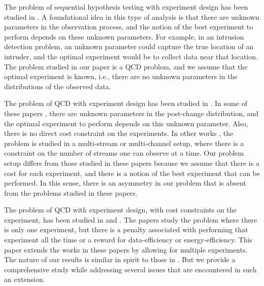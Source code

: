 \documentclass[journal, onecolumn]{IEEEtran}
\begin{document}
The problem of sequential hypothesis testing with experiment design has been studied in \cite{krishnamurthy2016, chernoff1959, bessler1960-2, albert1961, kiefer1963, lalley1986, keener1984, nitinawarat2013, naghshvar2013, nitinawarat2015, deshmukh2021, gurevich2019, hemo2020, vaidhiyan2018, tsopelakos2019, tsopelakos2020, tsopelakos2023}. A foundational idea in this type of analysis is that there are unknown parameters in the observation process, and the notion of the best experiment to perform depends on these unknown parameters. For example, in an intrusion detection problem, an unknown parameter could capture the true location of an intruder, and the optimal experiment would be to collect data near that location. The problem studied in our paper is a QCD problem, and we assume that the optimal experiment is known, i.e., there are no unknown parameters in the distributions of the observed data. 

The problem of QCD with experiment design has been studied in \cite{veeravalli2024, gopalan2021, dragalin1996, zhang2022, xu2021, chaudhuri2021, xu2023}. In some of these papers \cite{veeravalli2024, gopalan2021}, there are unknown parameters in the post-change distribution, and the optimal experiment to perform depends on this unknown parameter. Also, there is no direct cost constraint on the experiments. In other works \cite{dragalin1996, zhang2022, xu2021, chaudhuri2021, xu2023}, the problem is studied in a multi-stream or multi-channel setup, where there is a constraint on the number of streams one can observe at a time. Our problem setup differs from those studied in these papers because we assume that there is a cost for each experiment, and there is a notion of the best experiment that can be performed. In this sense, there is an asymmetry in our problem that is absent from the problems studied in these papers. 

The problem of QCD with experiment design, with cost constraints on the experiment, has been studied in \cite{banerjee2013, banerjee2012-2, banerjee2015, banerjee2013-2, banerjee2013-3, banerjee2015-2, banerjee2015-3} and \cite{ren2017}. The papers \cite{banerjee2013, banerjee2012-2, banerjee2015, banerjee2013-2, banerjee2013-3, banerjee2015-2, banerjee2015-3} study the problem where there is only one experiment, but there is a penalty associated with performing that experiment all the time or a reward for data-efficiency or energy-efficiency. This paper extends the works in these papers by allowing for multiple experiments. The nature of our results is similar in spirit to those in \cite{banerjee2013, banerjee2012-2, banerjee2015, banerjee2013-2, banerjee2013-3, banerjee2015-2, banerjee2015-3}. But we provide a comprehensive study while addressing several issues that are encountered in such an extension. 
\end{document}
